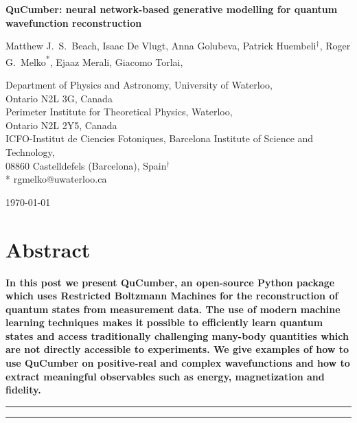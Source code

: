 \documentclass[submission, Phys]{SciPost}
\begin{document}
\begin{center}{\Large \textbf{
			QuCumber: neural network-based generative modelling for quantum wavefunction reconstruction
		}}\end{center}

\begin{center}
	Matthew J.~S.~Beach,
	Isaac De Vlugt,
	Anna Golubeva,
	Patrick Huembeli$^\dag$,
	Roger G.~Melko\textsuperscript{*},
	Ejaaz Merali,
	Giacomo Torlai,
\end{center}

\begin{center}
	Department of Physics and Astronomy, University of Waterloo,
	\\Ontario N2L 3G, Canada
	\\
	Perimeter Institute for Theoretical Physics, Waterloo,
	\\Ontario N2L 2Y5, Canada
	\\
	ICFO-Institut de Ciencies Fotoniques, Barcelona Institute of Science and Technology,
	\\08860 Castelldefels (Barcelona), Spain$^\dag$ \\
	* rgmelko@uwaterloo.ca \\
\end{center}

\begin{center}
	\today
\end{center}


\section*{Abstract}
{\bf
	In this post we present QuCumber, an open-source Python package which uses Restricted Boltzmann Machines for the reconstruction of quantum states from measurement data. 
    The use of modern machine learning techniques makes it possible to efficiently learn quantum states and access traditionally challenging many-body quantities which are not directly accessible to experiments. 
    We give examples of how to use QuCumber on positive-real and complex wavefunctions and how to extract meaningful observables such as energy, magnetization and fidelity.
}

\vspace{10pt}
\noindent\rule{\textwidth}{1pt}
\tableofcontents\thispagestyle{fancy}
\noindent\rule{\textwidth}{1pt}
\vspace{10pt}
\end{document}
